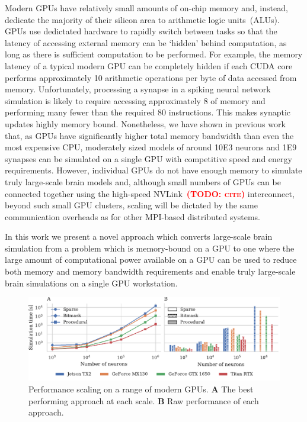 \documentclass[9pt,twocolumn,twoside,lineno]{pnas-new}
\newcommand{\todo}[1]{\textbf{\textsc{\textcolor{red}{(TODO: #1)}}}}
\begin{document}
Modern GPUs have relatively small amounts of on-chip memory and, instead, dedicate the majority of their silicon area to arithmetic logic units~(ALUs).
GPUs use dedictated hardware to rapidly switch between tasks so that the latency of accessing external memory can be `hidden' behind computation, as long as there is sufficient computation to be performed.
For example, the memory latency of a typical modern GPU can be completely hidden if each CUDA core performs approximately 10 arithmetic operations per byte of data accessed from memory.
Unfortunately, processing a synapse in a spiking neural network simulation is likely to require accessing approximately \SI{8}{\byte} of memory and performing many fewer than the required 80 instructions. This makes synaptic updates highly memory bound.
Nonetheless, we have shown in previous work~\citep{Knight2018} that, as GPUs have significantly higher total memory bandwidth than even the most expensive CPU, moderately sized models of around \num{10E3} neurons and \num{1E9} synapses can be simulated on a single GPU with competitive speed and energy requirements.
However, individual GPUs do not have enough memory to simulate truly large-scale brain models and, although small numbers of GPUs can be connected together using the high-speed NVLink~\todo{cite} interconnect, beyond such small GPU clusters, scaling will be dictated by the same communication overheads as for other MPI-based distributed systems.

In this work we present a novel approach which converts large-scale brain simulation from a problem which is memory-bound on a GPU to one where the large amount of computational power available on a GPU can be used to reduce both memory and memory bandwidth requirements and enable truly large-scale brain simulations on a single  GPU workstation.

\begin{figure}
    \centering
    \includegraphics{figures/performance_scaling}
    \caption{Performance scaling on a range of modern GPUs. \textbf{A} The best performing approach at each scale.
    \textbf{B} Raw performance of each approach.}
    \label{fig:performance_scaling}
\end{figure}
\end{document}
